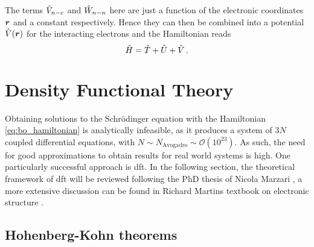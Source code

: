 \documentclass[main.tex]{subfiles}
\begin{document}
The terms \(\hat{V}_{n-e}\) and \(\hat{W}_{n-n}\) here are just a function of the electronic coordinates \(\vb*{r}\) and a constant respectively. Hence they can then be combined into a potential \(\hat{V} (\vb*{r})\) for the interacting electrons and the Hamiltonian reads
\begin{equation}\label{eq:solid_state_hamiltonian}
    \hat{H} = \hat{T} + \hat{U} + \hat{V}\,.
\end{equation}

\section{Density Functional Theory\label{sec:theory_dft}}

Obtaining solutions to the Schrödinger equation with the Hamiltonian \ref{eq:bo_hamiltonian} is analytically infeasible, as it produces a system of \(3N\) coupled differential equations, with \(N \sim N_{\mathrm{Avogadro}} \sim \mathcal{O} (10^{23})\).
As such, the need for good approximations to obtain results for real world
systems is high.
One particularly successful approach is \acrfull{dft}.
In the following section, the theoretical framework of \acrshort{dft} will be reviewed following the PhD thesis of Nicola Marzari \cite{marzari_ab-initio_1996}, a more extensive discussion can be found in Richard Martins textbook on electronic structure \cite{martin_electronic_2004}.

\subsection{Hohenberg-Kohn theorems}
\end{document}
